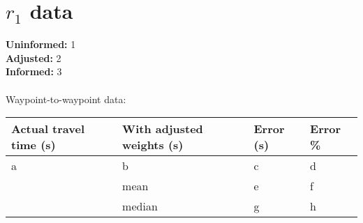 \section*{$r_1$ data}
\textbf{Uninformed:} 1\\
\textbf{Adjusted:} 2\\
\textbf{Informed:} 3\\
\\
Waypoint-to-waypoint data:
\begin{longtable}{llll}
	\textbf{Actual travel time (s)} & \textbf{With adjusted weights (s)}    & \textbf{Error (s)} & \textbf{Error \%} \\ \hline
	a & b & c & d \\ \hline
	& mean & e & f \\
	& median & g & h
\end{longtable}
